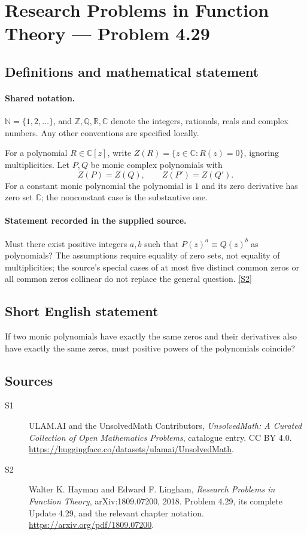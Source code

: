\documentclass[11pt]{book}
\newcommand{\sref}[2]{\hyperlink{source:#1:#2}{[S#2]}}
\begin{document}
\section{Research Problems in Function Theory — Problem 4.29}\label{statement}

\subsection{Definitions and mathematical statement}

\paragraph{Shared notation.}$\mathbb N=\{1,2,\ldots\}$, and $\mathbb Z,\mathbb Q,\mathbb R,\mathbb C$ denote the integers, rationals, reals and complex numbers. Any other conventions are specified locally.


For a polynomial $R\in\mathbb C[z]$, write $Z(R)=\{z\in\mathbb C:R(z)=0\}$, ignoring multiplicities. Let $P,Q$ be monic complex polynomials with
\[Z(P)=Z(Q),\qquad Z(P')=Z(Q').
\]
For a constant monic polynomial the polynomial is $1$ and its zero derivative has zero set $\mathbb C$; the nonconstant case is the substantive one.
\paragraph{Statement recorded in the supplied source.}
Must there exist positive integers $a,b$ such that $P(z)^a\equiv Q(z)^b$ as polynomials? The assumptions require equality of zero sets, not equality of multiplicities; the source's special cases of at most five distinct common zeros or all common zeros collinear do not replace the general question. \sref{statement}{2}
\subsection{Short English statement}
If two monic polynomials have exactly the same zeros and their derivatives also have exactly the same zeros, must positive powers of the polynomials coincide?
\subsection{Sources}
\begin{description}
\item[\hypertarget{source:statement:1}{S1}] ULAM.AI and the UnsolvedMath Contributors, \emph{UnsolvedMath: A Curated Collection of Open Mathematics Problems}, catalogue entry. CC BY 4.0. \url{https://huggingface.co/datasets/ulamai/UnsolvedMath}.
\item[\hypertarget{source:statement:2}{S2}] Walter K. Hayman and Edward F. Lingham, \emph{Research Problems in Function Theory}, arXiv:1809.07200, 2018. Problem 4.29, its complete Update 4.29, and the relevant chapter notation. \url{https://arxiv.org/pdf/1809.07200}.
\end{description}
\label{end:statement}
\end{document}
